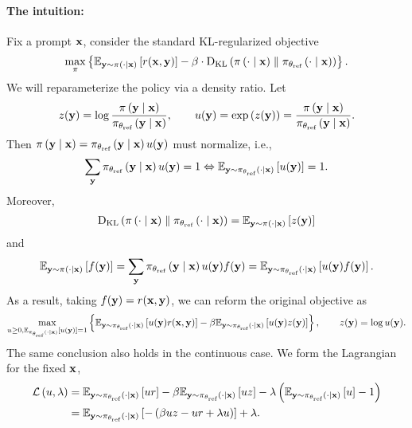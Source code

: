 \documentclass[11pt]{article}  %
\begin{document}
\paragraph{The intuition:} 
Fix a prompt $\mx$, consider the standard KL-regularized objective 
\begin{align*}
  \max_{\pi} \cbrac{\ExpSub{\my \sim \pisub{}{\cdot}{\mx}}{r(\mx, \my)} - \beta\cdot\klD{\pisub{}{\cdot}{\mx}}{\pisub{\thetaref}{\cdot}{\mx}}}.
\end{align*}
We will reparameterize the policy via a density ratio.
Let
\begin{align*}
  z(\my) = \log \frac{\pisub{}{\my}{\mx}}{\pisub{\thetaref}{\my}{\mx}}, \qquad u(\my) = \exp\rbrac{z(\my)} = \frac{\pisub{}{\my}{\mx}}{\pisub{\thetaref}{\my}{\mx}}.
\end{align*}
Then $\pisub{}{\my}{\mx} = \pisub{\thetaref}{\my}{\mx}u(\my)$ must normalize, i.e., 
\begin{align*}
  \sum_{\my}\pisub{\thetaref}{\my}{\mx}u(\my) = 1  \Leftrightarrow  \ExpSub{\my \sim \pisub{\thetaref}{\cdot}{\mx}}{u(\my)} = 1. 
\end{align*}
Moreover,
\begin{align*}
  \klD{\pisub{}{\cdot}{\mx}}{\pisub{\thetaref}{\cdot}{\mx}} = \ExpSub{\my \sim \pisub{}{\cdot}{\mx}}{z(\my)} 
\end{align*}
and
\begin{align}
  \label{eq:change-measure}
  \ExpSub{\my \sim \pisub{}{\cdot}{\mx}}{f(\my)} = \sum_{\my} \pisub{\thetaref}{\my}{\mx}u(\my)f(\my) =\ExpSub{\my \sim \pisub{\thetaref}{\cdot}{\mx}}{u(\my) f(\my)}.
\end{align}
As a result, taking $f(\my) = r(\mx, \my)$, we can reform the original objective as 
\begin{align*}
  \max_{u \geq 0, \ExpSub{\pisub{\thetaref}{\cdot}{\mx}}{u(\my)}=1} \cbrac{\ExpSub{\my \sim \pisub{\thetaref}{\cdot}{\mx}}{u(\my)r(\mx, \my)} - \beta\ExpSub{\my \sim \pisub{\thetaref}{\cdot}{\mx}}{u(\my)z(\my)}}, \qquad z(\my) = \log u(\my).
\end{align*}
The same conclusion also holds in the continuous case.
We form the Lagrangian for the fixed $\mx$,
\begin{align*}
  \cL\rbrac{u, \lambda} &= \ExpSub{\my \sim \pisub{\thetaref}{\cdot}{\mx}}{ur} - \beta  \ExpSub{\my \sim \pisub{\thetaref}{\cdot}{\mx}}{uz} - \lambda\rbrac{ \ExpSub{\my \sim \pisub{\thetaref}{\cdot}{\mx}}{u} - 1} \\
  &=  \ExpSub{\my \sim \pisub{\thetaref}{\cdot}{\mx}}{-\rbrac{\beta uz - ur + \lambda u} } + \lambda.
\end{align*}
\end{document}
